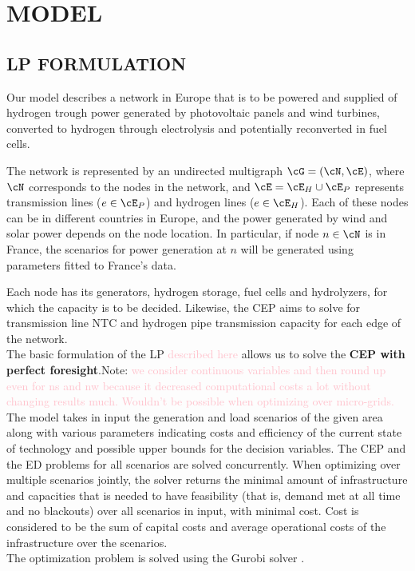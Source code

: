 \section{MODEL}

\subsection{LP FORMULATION}
Our model describes a network in Europe that is to be powered and supplied of hydrogen trough power generated by photovoltaic panels and wind turbines, converted to hydrogen through electrolysis and potentially reconverted in fuel cells.


The network is represented by an undirected multigraph \(\cG = (\cN, \cE)\), where \(\cN\) corresponds to the nodes in the network, and \(\cE = \cE_H \cup \cE_P\) represents transmission lines (\(e \in \cE_P\)) and hydrogen lines (\(e \in \cE_H\)). Each of these nodes can be in different countries in Europe, and the power generated by wind and solar power depends on the node location. In particular, if node \(n \in \cN\) is in France, the scenarios for power generation at \(n\) will be generated using parameters fitted to France's data.

Each node has its generators, hydrogen storage, fuel cells and hydrolyzers, for which the capacity is to be decided. Likewise, the CEP aims to solve for transmission line NTC and hydrogen pipe transmission capacity for each edge of the network.\\
\indent The basic formulation of the LP \textcolor{pink}{described here} allows us to solve the \textbf{CEP with perfect foresight}.Note: \textcolor{pink}{we consider continuous variables and then round up even for ns and nw because it decreased computational costs a lot without changing results much. Wouldn't be possible when optimizing over micro-grids.}\\
\indent The model takes in input the generation and load scenarios of the given area along with various parameters indicating costs and efficiency of the current state of technology and possible upper bounds for the decision variables. The CEP and the ED problems for all scenarios are solved concurrently. When optimizing over multiple scenarios jointly, the solver returns the minimal amount of infrastructure and capacities that is needed to have feasibility (that is, demand met at all time and no blackouts) over all scenarios in input, with minimal cost. Cost is considered to be the sum of capital costs and average operational costs of the infrastructure over the scenarios.\\
\indent The optimization problem is solved using the Gurobi solver \textcolor{green}{\cite{Gurobi}}.



